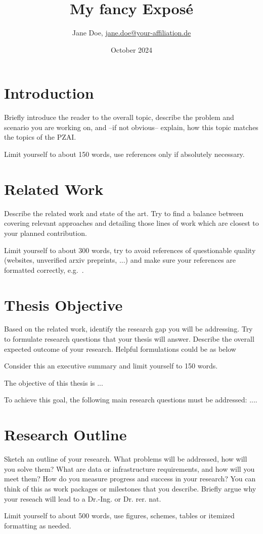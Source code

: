 \documentclass[11pt,DIV=16,parskip=half]{scrartcl}
\title{My fancy Exposé}
\author{Jane Doe, \href{mailto:jane.doe@your-affiliation.de}{jane.doe@your-affiliation.de}}
\date{October 2024}
\begin{document}
\maketitle

\section{Introduction}
Briefly introduce the reader to the overall topic, describe the problem and scenario you are working on, and --if not obvious-- explain, how this topic matches the topics of the PZAI.

Limit yourself to about 150 words, use references only if absolutely necessary.



\section{Related Work}
Describe the related work and state of the art.
Try to find a balance between covering relevant approaches and detailing those lines of work which are closest to your planned contribution.

Limit yourself to about 300 words, try to avoid references of questionable quality (websites, unverified arxiv preprints, ...) and make sure your references are formatted correctly, e.g.~\cite{cooley1965-fft}.



\section{Thesis Objective}
Based on the related work, identify the research gap you will be addressing.
Try to formulate research questions that your thesis will answer.
Describe the overall expected outcome of your research.
Helpful formulations could be as below

Consider this an executive summary and limit yourself to 150 words.

The objective of this thesis is ...

To achieve this goal, the following main research questions must be addressed: ....


\section{Research Outline}
Sketch an outline of your research.
What problems will be addressed, how will you solve them?
What are data or infrastructure requirements, and how will you meet them?
How do you measure progress and success in your research?
You can think of this as work packages or milestones that you describe.
Briefly argue why your reseach will lead to a Dr.-Ing. or Dr. rer. nat.

Limit yourself to about 500 words, use figures, schemes, tables or itemized formatting as needed.



\printbibliography
\end{document}
